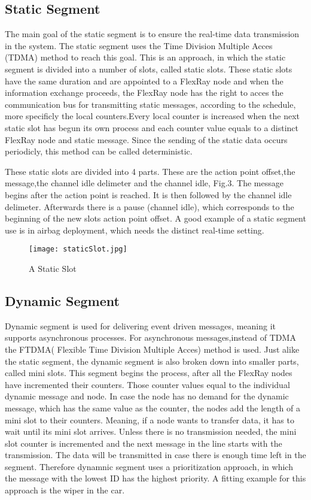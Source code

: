 \documentclass[conference]{IEEEtran}
\begin{document}
\subsection{Static Segment}
The main goal of the static segment is to ensure the real-time data transmission in the system. The static segment uses the Time Division Multiple Acces (TDMA) method to reach this goal. This is an approach, in which the static segment is divided into a number of slots, called static slots. These static slots have the same duration and are appointed to a FlexRay node and when the information exchange proceeds, the FlexRay node has the right to acces the communication bus for transmitting static messages, according to the schedule, more specificly the local counters.Every local counter is increased when the next static slot has begun its own process and each counter value equals to a distinct FlexRay node and static message. Since the sending of the static data occurs periodicly, this method can be called deterministic.

These static slots are divided into 4 parts. These are the action point offset,the message,the channel idle delimeter and the channel idle, Fig.3. The message begins after the action point is reached. It is then followed by the channel idle delimeter. Afterwards there is a pause (channel idle), which corresponds to the beginning of the new slots action point offset. A good example of a static segment use is in airbag deployment, which needs the distinct real-time setting.

\begin{figure}[htbp]
 \centerline{ \texttt{[image: staticSlot.jpg]}}
  \caption{A Static Slot}
  \label{fig:slot}
\end{figure}

\subsection{Dynamic Segment}
Dynamic segment is used for delivering event driven messages, meaning it supports asynchronous processes. For asynchronous messages,instead of TDMA the FTDMA( Flexible Time Division Multiple Acces) method is used. Just alike the static segment, the dynamic segment is also broken down into smaller parts, called mini slots. This segment begins the process, after all the FlexRay nodes have incremented their counters. Those counter values equal to the individual dynamic message and node. In case the node has no demand for the dynamic message, which has the same value as the counter, the nodes add the length of a mini slot to their counters. Meaning, if a node wants to transfer data, it has to wait until its mini slot arrives. Unless there is no transmission needed, the mini slot counter is incremented and the next message in the line starts with the transmission. The data will be transmitted in case there is enough time left in the segment. Therefore dynamnic segment uses a prioritization approach, in which the  message with the lowest ID has the highest priority. A fitting example for this approach is the wiper in the car.
\end{document}
